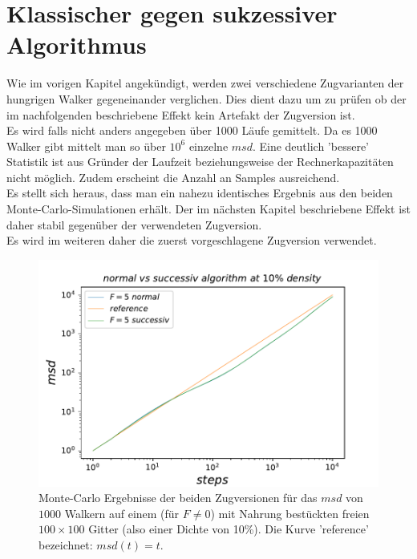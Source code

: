 \documentclass[a4paper, 12pt]{report}
\begin{document}
\section{Klassischer gegen sukzessiver Algorithmus}
Wie im vorigen Kapitel angekündigt, werden zwei verschiedene Zugvarianten der hungrigen Walker gegeneinander verglichen. Dies dient dazu um zu prüfen ob der im nachfolgenden beschriebene Effekt kein Artefakt der Zugversion ist.
\\
\noindent Es wird falls nicht anders angegeben über 1000 Läufe gemittelt. Da es 1000 Walker gibt mittelt man so über $10^6$ einzelne $msd$. Eine deutlich 'bessere' Statistik ist aus Gründer der Laufzeit beziehungsweise der Rechnerkapazitäten nicht möglich. Zudem erscheint die Anzahl an Samples ausreichend.
\\
\noindent Es stellt sich heraus, dass man ein nahezu identisches Ergebnis aus den beiden Monte-Carlo-Simulationen erhält. Der im nächsten Kapitel beschriebene Effekt ist daher stabil gegenüber der verwendeten Zugversion.
\\
\noindent Es wird im weiteren daher die zuerst vorgeschlagene Zugversion verwendet.

\begin{figure}[h!]
	\centering
	\includegraphics[scale=0.9]{suc.pdf}
	\caption{Monte-Carlo Ergebnisse der beiden Zugversionen für das $msd$ von $1000$ Walkern auf einem (für $F\neq0$) mit Nahrung bestückten freien $100\times 100$ Gitter (also einer Dichte von 10\%). Die Kurve 'reference' bezeichnet: $msd(t)=t$.}
\end{figure}

\newpage 
\end{document}
